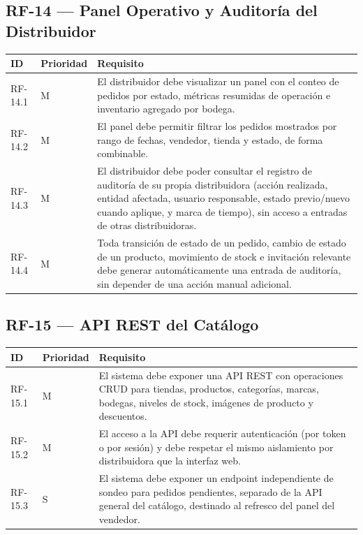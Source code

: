 \documentclass[12pt,a4paper]{report}
\begin{document}
\subsection{RF-14 --- Panel Operativo y Auditoría del Distribuidor}

\begin{longtable}{|p{2cm}|p{2cm}|p{10cm}|}
\hline
\textbf{ID} & \textbf{Prioridad} & \textbf{Requisito} \\ \hline
RF-14.1 & M & El distribuidor debe visualizar un panel con el conteo de pedidos por estado, métricas resumidas de operación e inventario agregado por bodega. \\ \hline
RF-14.2 & M & El panel debe permitir filtrar los pedidos mostrados por rango de fechas, vendedor, tienda y estado, de forma combinable. \\ \hline
RF-14.3 & M & El distribuidor debe poder consultar el registro de auditoría de su propia distribuidora (acción realizada, entidad afectada, usuario responsable, estado previo/nuevo cuando aplique, y marca de tiempo), sin acceso a entradas de otras distribuidoras. \\ \hline
RF-14.4 & M & Toda transición de estado de un pedido, cambio de estado de un producto, movimiento de stock e invitación relevante debe generar automáticamente una entrada de auditoría, sin depender de una acción manual adicional. \\ \hline
\end{longtable}

\subsection{RF-15 --- API REST del Catálogo}

\begin{longtable}{|p{2cm}|p{2cm}|p{10cm}|}
\hline
\textbf{ID} & \textbf{Prioridad} & \textbf{Requisito} \\ \hline
RF-15.1 & M & El sistema debe exponer una API REST con operaciones CRUD para tiendas, productos, categorías, marcas, bodegas, niveles de stock, imágenes de producto y descuentos. \\ \hline
RF-15.2 & M & El acceso a la API debe requerir autenticación (por token o por sesión) y debe respetar el mismo aislamiento por distribuidora que la interfaz web. \\ \hline
RF-15.3 & S & El sistema debe exponer un endpoint independiente de sondeo para pedidos pendientes, separado de la API general del catálogo, destinado al refresco del panel del vendedor. \\ \hline
\end{longtable}
\end{document}
